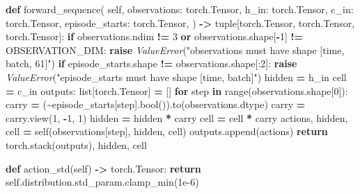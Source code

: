 \documentclass[
  chinese,
  11pt,
  letterpaper,
]{article}
\newenvironment{Shaded}{\begin{snugshade}}{\end{snugshade}}
\newcommand{\BuiltInTok}[1]{#1}
\newcommand{\ControlFlowTok}[1]{\textcolor[rgb]{0.13,0.29,0.53}{\textbf{#1}}}
\newcommand{\DecValTok}[1]{\textcolor[rgb]{0.00,0.00,0.81}{#1}}
\newcommand{\FloatTok}[1]{\textcolor[rgb]{0.00,0.00,0.81}{#1}}
\newcommand{\KeywordTok}[1]{\textcolor[rgb]{0.13,0.29,0.53}{\textbf{#1}}}
\newcommand{\NormalTok}[1]{#1}
\newcommand{\OperatorTok}[1]{\textcolor[rgb]{0.81,0.36,0.00}{\textbf{#1}}}
\newcommand{\PreprocessorTok}[1]{\textcolor[rgb]{0.56,0.35,0.01}{\textit{#1}}}
\newcommand{\StringTok}[1]{\textcolor[rgb]{0.31,0.60,0.02}{#1}}
\newcommand{\VariableTok}[1]{\textcolor[rgb]{0.00,0.00,0.00}{#1}}
\renewenvironment{Shaded}{\par\smallskip}{\par\smallskip}
\begin{document}
\begin{Shaded}
\begin{Highlighting}[]
    \KeywordTok{def}\NormalTok{ forward\_sequence(}
        \VariableTok{self}\NormalTok{,}
\NormalTok{        observations: torch.Tensor,}
\NormalTok{        h\_in: torch.Tensor,}
\NormalTok{        c\_in: torch.Tensor,}
\NormalTok{        episode\_starts: torch.Tensor,}
\NormalTok{    ) }\OperatorTok{{-}\textgreater{}} \BuiltInTok{tuple}\NormalTok{[torch.Tensor, torch.Tensor, torch.Tensor]:}
        \ControlFlowTok{if}\NormalTok{ observations.ndim }\OperatorTok{!=} \DecValTok{3} \KeywordTok{or}\NormalTok{ observations.shape[}\OperatorTok{{-}}\DecValTok{1}\NormalTok{] }\OperatorTok{!=}\NormalTok{ OBSERVATION\_DIM:}
            \ControlFlowTok{raise} \PreprocessorTok{ValueError}\NormalTok{(}\StringTok{"observations must have shape [time, batch, 61]"}\NormalTok{)}
        \ControlFlowTok{if}\NormalTok{ episode\_starts.shape }\OperatorTok{!=}\NormalTok{ observations.shape[:}\DecValTok{2}\NormalTok{]:}
            \ControlFlowTok{raise} \PreprocessorTok{ValueError}\NormalTok{(}\StringTok{"episode\_starts must have shape [time, batch]"}\NormalTok{)}
\NormalTok{        hidden }\OperatorTok{=}\NormalTok{ h\_in}
\NormalTok{        cell }\OperatorTok{=}\NormalTok{ c\_in}
\NormalTok{        outputs: }\BuiltInTok{list}\NormalTok{[torch.Tensor] }\OperatorTok{=}\NormalTok{ []}
        \ControlFlowTok{for}\NormalTok{ step }\KeywordTok{in} \BuiltInTok{range}\NormalTok{(observations.shape[}\DecValTok{0}\NormalTok{]):}
\NormalTok{            carry }\OperatorTok{=}\NormalTok{ (}\OperatorTok{\textasciitilde{}}\NormalTok{episode\_starts[step].}\BuiltInTok{bool}\NormalTok{()).to(observations.dtype)}
\NormalTok{            carry }\OperatorTok{=}\NormalTok{ carry.view(}\DecValTok{1}\NormalTok{, }\OperatorTok{{-}}\DecValTok{1}\NormalTok{, }\DecValTok{1}\NormalTok{)}
\NormalTok{            hidden }\OperatorTok{=}\NormalTok{ hidden }\OperatorTok{*}\NormalTok{ carry}
\NormalTok{            cell }\OperatorTok{=}\NormalTok{ cell }\OperatorTok{*}\NormalTok{ carry}
\NormalTok{            actions, hidden, cell }\OperatorTok{=} \VariableTok{self}\NormalTok{(observations[step], hidden, cell)}
\NormalTok{            outputs.append(actions)}
        \ControlFlowTok{return}\NormalTok{ torch.stack(outputs), hidden, cell}

    \KeywordTok{def}\NormalTok{ action\_std(}\VariableTok{self}\NormalTok{) }\OperatorTok{{-}\textgreater{}}\NormalTok{ torch.Tensor:}
        \ControlFlowTok{return} \VariableTok{self}\NormalTok{.distribution.std\_param.clamp\_min(}\FloatTok{1e{-}6}\NormalTok{)}



\end{Highlighting}
\end{Shaded}
\end{document}
